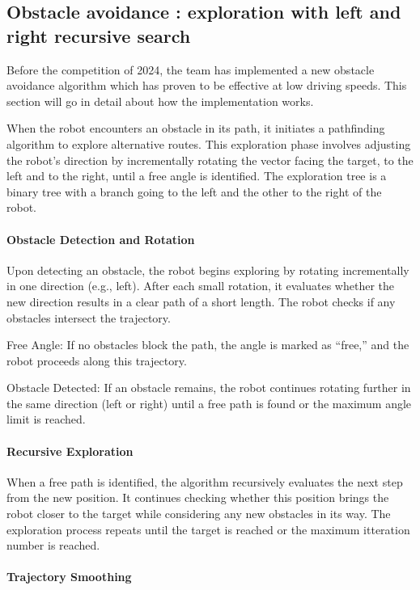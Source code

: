 \subsection{Obstacle avoidance : exploration with left and right recursive search}
Before the competition of 2024, the team has implemented a new obstacle avoidance algorithm which has
proven to be effective at low driving speeds. This section will go in detail about how the implementation works.

When the robot encounters an obstacle in its path, it initiates a pathfinding algorithm to explore alternative routes. This exploration phase involves adjusting the robot’s direction by incrementally rotating the vector facing the target, to the left and to the right, until a free angle is identified. The exploration tree is a binary tree with a branch going to the left and the other to the right of the robot.

\paragraph{Obstacle Detection and Rotation}

Upon detecting an obstacle, the robot begins exploring by rotating incrementally in one direction (e.g., left). After each small rotation, it evaluates whether the new direction results in a clear path of a short length. The robot checks if any obstacles intersect the trajectory.

Free Angle: If no obstacles block the path, the angle is marked as “free,” and the robot proceeds along this trajectory.

Obstacle Detected: If an obstacle remains, the robot continues rotating further in the same direction (left or right) until a free path is found or the maximum angle limit is reached.

\paragraph{Recursive Exploration}

When a free path is identified, the algorithm recursively evaluates the next step from the new position. It continues checking whether this position brings the robot closer to the target while considering any new obstacles in its way. The exploration process repeats until the target is reached or the maximum itteration number is reached.

\paragraph{Trajectory Smoothing}

